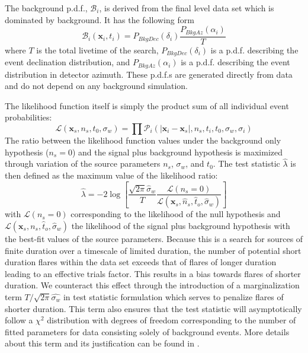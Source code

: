 \documentclass[manuscript]{aastex}
\begin{document}
The background p.d.f., $\mathcal{B}_i$, is derived from the final level data set which is dominated by background. It has the following form
\begin{equation}
\mathcal{B}_i(\mathbf{x}_i,t_i) = P_{BkgDec}(\delta_i)\frac{P_{BkgAz}(\alpha_i)}{T}
\end{equation}
where $T$ is the total livetime of the search, $P_{BkgDec}(\delta_i)$ is a p.d.f. describing the event declination distribution, and $P_{BkgAz}(\alpha_i)$ is a p.d.f. describing the event distribution in detector azimuth. These p.d.f.s are generated directly from data and do not depend on any background simulation.

The likelihood function itself is simply the product sum of all individual event probabilities:
\begin{equation}\label{eq:LLH}
\mathcal{L}(\mathbf{x}_s,n_s,t_0,\sigma_w) = \prod \mathcal{P}_i(|\mathbf{x}_i-\mathbf{x}_s|,n_s,t_i,t_0,\sigma_w,\sigma_i)
\end{equation}
The ratio between the likelihood function values under the background only hypothesis ($n_s=0$) and the signal plus background hypothesis is maximized through variation of the source parameters $n_s$, $\sigma_w$, and $t_0$. The test statistic $\hat{\lambda}$ is then defined as the maximum value of the likelihood ratio:
\begin{equation}\label{eq:TS}
\hat{\lambda} = -2\log \left[\frac{\sqrt{2\pi}\hat{\sigma}_w}{T}\frac{\mathcal{L}(n_s = 0)}{\mathcal{L}(\mathbf{x}_s,\hat{n}_s,\hat{t}_o,\hat{\sigma}_w)} \right]
\end{equation}
with $\mathcal{L}(n_s = 0)$ corresponding to the likelihood of the null hypothesis and $\mathcal{L}(\mathbf{x}_s,{n}_s,\hat{t}_o,\hat{\sigma}_w)$ the likelihood of the signal plus background hypothesis with the best-fit values of the source parameters. Because this is a search for sources of finite duration over a timescale of limited duration, the number of potential short duration flares within the data set exceeds that of flares of longer duration leading to an effective trials factor. This results in a bias towards flares of shorter duration. We counteract this effect through the introduction of a marginalization term $T/\sqrt{2\pi}\hat{\sigma_w}$ in test statistic formulation which serves to penalize flares of shorter duration. This term also ensures that the test statistic will asymptotically follow a $\chi^2$ distribution with degrees of freedom corresponding to the number of fitted parameters for data consisting solely of background events. More details about this term and its justification can be found in \cite{2010APh....33..175B}.
\end{document}
